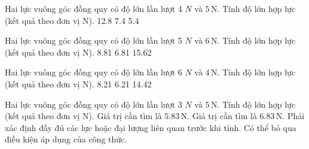 \begin{ex}
Hai lực vuông góc đồng quy có độ lớn lần lượt 4 $N$ và $5\,\text{N}$. Tính độ lớn hợp lực (kết quả theo đơn vị N).
\choice
{12.8}
{7.4}
{5.4}
{}
\end{ex}

\begin{ex}
Hai lực vuông góc đồng quy có độ lớn lần lượt 5 $N$ và $6\,\text{N}$. Tính độ lớn hợp lực (kết quả theo đơn vị N).
\choice
{}
{8.81}
{6.81}
{15.62}
\end{ex}

\begin{ex}
Hai lực vuông góc đồng quy có độ lớn lần lượt 6 $N$ và $4\,\text{N}$. Tính độ lớn hợp lực (kết quả theo đơn vị N).
\choice
{8.21}
{}
{6.21}
{14.42}
\end{ex}

\begin{ex}
Hai lực vuông góc đồng quy có độ lớn lần lượt 3 $N$ và $5\,\text{N}$. Tính độ lớn hợp lực (kết quả theo đơn vị N).
\choiceTF
{\True Giá trị cần tìm là $5.83\,\text{N}$.}
{Giá trị cần tìm là $6.83\,\text{N}$.}
{\True Phải xác định đầy đủ các lực hoặc đại lượng liên quan trước khi tính.}
{Có thể bỏ qua điều kiện áp dụng của công thức.}
\end{ex}

